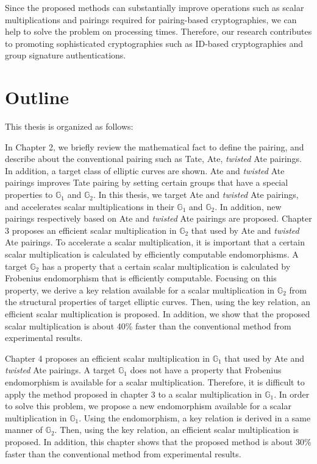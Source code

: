 Since the proposed methods can substantially improve operations such as scalar multiplications and pairings required for pairing-based cryptographies, we can help to solve the problem on processing times.  
Therefore, our research contributes to promoting sophisticated cryptographies such as ID-based cryptographies and group signature authentications. 


\section{Outline}

This thesis is organized as follows: 

In Chapter 2, we briefly review the mathematical fact to define the pairing, and describe about the conventional pairing such as Tate, Ate, {\it twisted} Ate pairings.
In addition, a target class of elliptic curves are shown.
Ate and {\it twisted} Ate pairings improves Tate pairing by setting certain groups that have a special properties to $\mathbb{G}_1$ and $\mathbb{G}_2$.
In this thesis, we target Ate and {\it twisted} Ate pairings, and accelerates scalar multiplications in their $\mathbb{G}_1$ and $\mathbb{G}_2$.
In addition, new pairings respectively based on Ate and {\it twisted} Ate pairings are proposed.  
%
Chapter 3 proposes an efficient scalar multiplication in $\mathbb{G}_2$ that used by Ate and {\it twisted} Ate pairings.
To accelerate a scalar multiplication, it is important that a certain scalar multiplication is calculated by efficiently computable endomorphisms.
A target $\mathbb{G}_2$ has a property that a certain scalar multiplication is calculated by Frobenius endomorphism that is efficiently computable.
Focusing on this property, we derive a key relation available for a scalar multiplication in $\mathbb{G}_2$ from the structural properties of target elliptic curves.
Then, using the key relation, an efficient scalar multiplication is proposed.
In addition, we show that the proposed scalar multiplication is about 40\% faster than the conventional method from experimental results.   

Chapter 4 proposes an efficient scalar multiplication in $\mathbb{G}_1$ that used by Ate and {\it twisted} Ate pairings.
A target $\mathbb{G}_1$ does not have a property that Frobenius endomorphism is available for a scalar multiplication.
Therefore, it is difficult to apply the method proposed in chapter 3 to a scalar multiplication in $\mathbb{G}_1$.
In order to solve this problem, we propose a new endomorphism available for a scalar multiplication in $\mathbb{G}_1$.
Using the endomorphism, a key relation is derived in a same manner of $\mathbb{G}_2$.
Then, using the key relation, an efficient scalar multiplication is proposed.   
In addition, this chapter shows that the proposed method is about 30\% faster than the conventional method from experimental results.   

